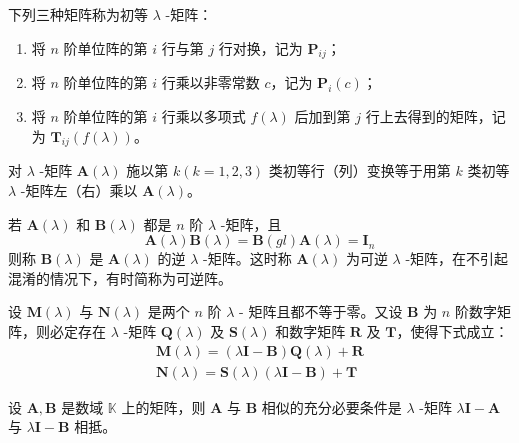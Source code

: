 \begin{definition}
    下列三种矩阵称为初等 $\lambda$ -矩阵：
    \begin{enumerate}
        \item 将 $n$ 阶单位阵的第 $i$ 行与第 $j$ 行对换，记为 $\bm{P}_{ij}$；
        \item 将 $n$ 阶单位阵的第 $i$ 行乘以非零常数 $c$，记为 $\bm{P}_{i}(c)$；
        \item 将 $n$ 阶单位阵的第 $i$ 行乘以多项式 $f(\lambda)$ 后加到第 $j$ 行上去得到的矩阵，记为 $\bm{T}_{ij}(f(\lambda))$。
    \end{enumerate}
\end{definition}

\begin{theorem}
    对 $\lambda$ -矩阵 $\bm{A}(\lambda)$ 施以第 $k(k = 1, 2, 3)$ 类初等行（列）变换等于用第 $k$ 类初等 $\lambda$ -矩阵左（右）乘以 $\bm{A}(\lambda)$。
\end{theorem}

\begin{definition}
    若 $\bm{A}(\lambda)$ 和 $\bm{B}(\lambda)$ 都是 $n$ 阶 $\lambda$ -矩阵，且
    \[
        \bm{A}(\lambda)\bm{B}(\lambda) = \bm{B}(gl)\bm{A}(\lambda) = \bm{I}_{n}
    \]
    则称 $\bm{B}(\lambda)$ 是 $\bm{A}(\lambda)$ 的逆 $\lambda$ -矩阵。这时称 $\bm{A}(\lambda)$ 为可逆 $\lambda$ -矩阵，在不引起混淆的情况下，有时简称为可逆阵。
\end{definition}

\begin{lemma}
    设 $\bm{M}(\lambda)$ 与 $\bm{N}(\lambda)$ 是两个 $n$ 阶 $\lambda$ - 矩阵且都不等于零。又设 $\bm{B}$ 为 $n$ 阶数字矩阵，则必定存在 $\lambda$ -矩阵 $\bm{Q}(\lambda)$ 及 $\bm{S}(\lambda)$ 和数字矩阵 $\bm{R}$ 及 $\bm{T}$，使得下式成立：
    \begin{align*}
        \bm{M}(\lambda) = (\lambda \bm{I} - \bm{B})\bm{Q}(\lambda) + \bm{R} \\
        \bm{N}(\lambda) = \bm{S}(\lambda)(\lambda \bm{I} - \bm{B}) + \bm{T}
    \end{align*}
\end{lemma}

\begin{theorem}
  设 $\bm{A}, \bm{B}$ 是数域 $\mathbb{K}$ 上的矩阵，则 $\bm{A}$ 与 $\bm{B}$ 相似的充分必要条件是 $\lambda$ -矩阵 $\lambda \bm{I} - \bm{A}$ 与 $\lambda \bm{I} - \bm{B}$ 相抵。
\end{theorem}




